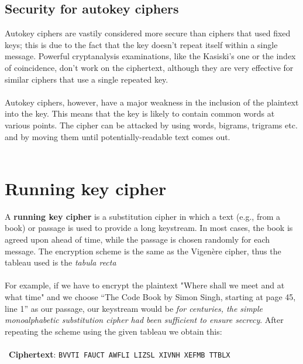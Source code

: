 \documentclass[Lau,binding=0.6cm,oneside]{sapthesis}
\begin{document}
\subsection{Security for autokey ciphers}
Autokey ciphers are vastily considered more secure than ciphers that used fixed keys; this is due to the fact that the key doesn't repeat itself within a single message. Powerful cryptanalysis examinations, like the Kasiski's one or the index of coincidence, don't work on the ciphertext\supercite{autokey}, although they are very effective for similar ciphers that use a single repeated key.\\\\
Autokey ciphers, however, have a major weakness in the inclusion of the plaintext into the key. This means that the key is likely to contain common words at various points. The cipher can be attacked by using words, bigrams, trigrams etc. and by moving them until potentially-readable text comes out.\\\\

\section{Running key cipher}
A \textbf{running key cipher} is a substitution cipher in which a text (e.g., from a book) or passage is used to provide a long keystream. In most cases, the book is agreed upon ahead of time, while the passage is chosen randomly for each message. The encryption scheme is the same as the Vigenère cipher, thus the tableau used is the \textit{tabula recta}\\\\
For example, if we have to encrypt the plaintext "Where shall we meet and at what time" and we choose “The Code Book by Simon Singh, starting at page 45, line 1” as our passage, our keystream would be \textit{for centuries, the simple monoalphabetic substitution cipher had been sufficient to ensure secrecy}. After repeating the scheme using the given tableau we obtain this:\\\\\
\textbf{Ciphertext}: \colorbox{gray!12}{\small{\texttt{BVVTI FAUCT AWFLI LIZSL XIVNH XEFMB TTBLX}}}\\\
\end{document}
